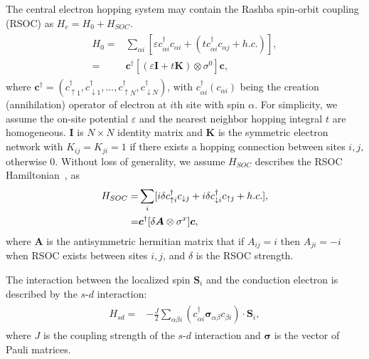 \documentclass[aps,prb,twocolumn,showpacs,amssymb]{revtex4-1}
\begin{document}
The central electron hopping system may contain the Rashba spin-orbit coupling (RSOC) as $H_e=H_0+H_{SOC}$.
\begin{eqnarray}
\begin{split}
H_0=&\sum\limits_{{\alpha}i}[{\varepsilon}c_{{\alpha}i}^{\dagger}c_{{\alpha}i}+(tc_{{\alpha}i}^{\dagger}c_{{\alpha}j}+h.c.)], \\
=&\bm{c}^\dagger[(\varepsilon\bm{I}+t\bm{K})\otimes\sigma^0]\bm{c},\label{equ:H0}
\end{split}
\end{eqnarray}
where $\bm{c}^\dagger=(c^{\dag}_{{\uparrow}1},c^{\dag}_{{\downarrow}1}, ... , c^{\dag}_{{\uparrow}N}, c^{\dag}_{{\downarrow}N})$, with $c_{{\alpha}i}^{\dagger}(c_{{\alpha}i})$ being the creation (annihilation) operator of electron at $i$th site with spin $\alpha$.
For simplicity, we assume the on-site potential $\varepsilon$ and the nearest neighbor hopping integral $t$ are homogeneous. $\bm{I}$ is $N\times N$ identity matrix and $\bm K$ is the symmetric electron network with $K_{ij}=K_{ji}=1$ if there exists a hopping connection between sites $i, j$, otherwise $0$. Without loss of generality, we assume $H_{SOC}$ describes the RSOC Hamiltonian~\cite{TS2016,Bychkov1984,Christopher2016,VG2005,RM2010,YO2010},  as
\begin{eqnarray}{\label{equ:HRX}}
\begin{split}
H_{SOC}=&\sum\limits_{i}[i{\delta}c^{\dag}_{{\uparrow}i}c_{{\downarrow}j}+i{\delta}c^{\dag}_{{\downarrow}i}c_{{\uparrow}j}+h.c.],\\
=&\bm{c}^\dagger[\delta\bm{A}\otimes\sigma^x]\bm{c},
\end{split}
\end{eqnarray}
where $\bm A$ is the antisymmetric hermitian matrix that if $A_{ij}=i$ then $A_{ji}=-i$ when RSOC exists between sites $i, j$, and $\delta$ is the RSOC strength.

The interaction between the localized spin $\bm{S}_i$ and the conduction electron is described by the $s$-$d$ interaction:
\begin{eqnarray}
\begin{split}
H_{sd}=&-\frac{J}{2}\sum\limits_{{\alpha\beta}i}(c_{{\alpha}i}^{\dagger}\bm{\sigma}_{\alpha\beta}c_{{\beta}i})\cdot\bm{S}_{i},
\end{split}
\end{eqnarray}
where $J$ is the coupling strength of the $s$-$d$ interaction and $\bm{\sigma}$ is the vector of Pauli matrices.
\end{document}
